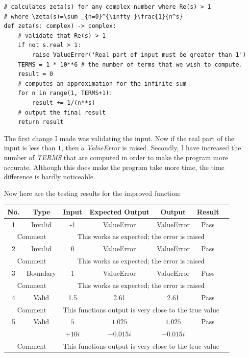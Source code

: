 \documentclass[12pt]{article}
\begin{document}
\begin{lstlisting}
# calculates zeta(s) for any complex number where Re(s) > 1
# where \zeta(s)=\sum _{n=0}^{\infty }\frac{1}{n^s}
def zeta(s: complex) -> complex:
    # validate that Re(s) > 1
    if not s.real > 1:
        raise ValueError('Real part of input must be greater than 1')
    TERMS = 1 * 10**6 # the number of terms that we wish to compute.
    result = 0
    # computes an approximation for the infinite sum
    for n in range(1, TERMS+1):
        result += 1/(n**s)
    # output the final result
    return result
\end{lstlisting}

The first change I made was validating the input. Now if the real part of the input is less than $1$, then a \textit{ValueError} is raised. Secondly, I have increased the number of \textit{TERMS} that are computed in order to make the program more accurate. Although this does make the program take more time, the time difference is hardly noticeable.

Now here are the testing results for the improved function:
\clearpage

\begin{table}[ht]
    \centering
    \begin{tabular}{|c|c|c|c|c|c|c|}
    \hline
    \textbf{No.} & \textbf{Type} & \textbf{Input} & \textbf{Expected Output} & \textbf{Output} & \textbf{Result}\\
    \hline
    \hline
    1 & Invalid & -1 & ValueError & ValueError & Pass\\
    \hline
    \multicolumn{2}{|c|}{Comment} & \multicolumn{4}{|c|}{This works as expected; the error is raised}\\
    \hline
    \hline
    2 & Invalid & 0 & ValueError & ValueError & Pass\\
    \hline
    \multicolumn{2}{|c|}{Comment} & \multicolumn{4}{|c|}{This works as expected; the error is raised}\\
    \hline
    \hline
    3 & Boundary & 1 & ValueError & ValueError & Pass\\
    \hline
    \multicolumn{2}{|c|}{Comment} & \multicolumn{4}{|c|}{This works as expected; the error is raised}\\
    \hline
    \hline
    4 & Valid & 1.5 & 2.61 & 2.61 & Pass\\
    \hline
    \multicolumn{2}{|c|}{Comment} & \multicolumn{4}{|c|}{This functions output is very close to the true value}\\
    \hline
    \hline
    5 & Valid & $5$ & $1.025$ & $1.025$ & Pass\\
      & & $+10i$ & $-0.015i$ & $-0.015i$  & \\
    \hline
    \multicolumn{2}{|c|}{Comment} & \multicolumn{4}{|c|}{This functions output is very close to the true value}\\
    \hline
    \end{tabular}
\end{table}
\end{document}
